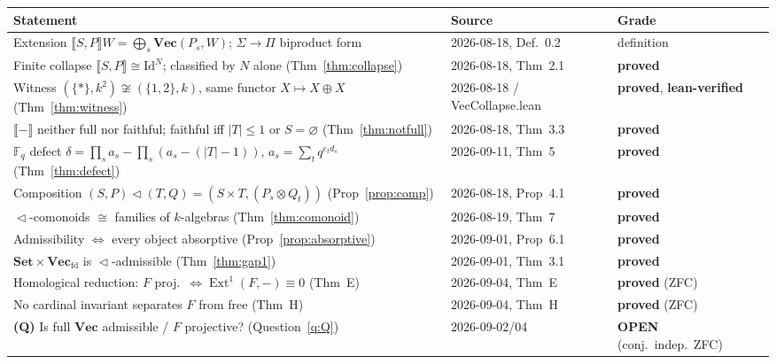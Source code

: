 \documentclass[11pt]{article}
\theoremstyle{plain}
\theoremstyle{definition}
\theoremstyle{remark}
\newcommand{\Set}{\mathbf{Set}}
\newcommand{\Vect}{\mathbf{Vec}}
\newcommand{\Vecfd}{\mathbf{Vec}_{\mathrm{fd}}}
\newcommand{\ext}[1]{\llbracket #1 \rrbracket}
\renewcommand{\lhd}{\vartriangleleft}
\DeclareMathOperator{\Ext}{Ext}
\begin{document}
\begin{center}
\small
\renewcommand{\arraystretch}{1.25}
\begin{tabular}{@{}p{} p{} p{}@{}}
\toprule
\textbf{Statement} & \textbf{Source} & \textbf{Grade}\\
\midrule
Extension $\ext{S,P}W=\bigoplus_s\Vect(P_s,W)$; $\Sigma\!\to\!\Pi$ biproduct form
  & 2026-08-18, Def.\ 0.2 & definition\\
Finite collapse $\ext{S,P}\cong\mathrm{Id}^N$; classified by $N$ alone (Thm~\ref{thm:collapse})
  & 2026-08-18, Thm~2.1 & \textbf{proved}\\
Witness $(\{\ast\},k^2)\not\cong(\{1,2\},k)$, same functor $X\mapsto X\oplus X$ (Thm~\ref{thm:witness})
  & 2026-08-18 / VecCollapse.lean & \textbf{proved}, \textbf{lean-verified}\\
$\ext{-}$ neither full nor faithful; faithful iff $|T|\leq1$ or $S=\varnothing$ (Thm~\ref{thm:notfull})
  & 2026-08-18, Thm~3.3 & \textbf{proved}\\
$\mathbb F_q$ defect $\delta=\prod_s a_s-\prod_s(a_s-(|T|-1))$, $a_s=\sum_t q^{e_t d_s}$ (Thm~\ref{thm:defect})
  & 2026-09-11, Thm~5 & \textbf{proved}\\
Composition $(S,P)\lhd(T,Q)=(S\times T,(P_s\otimes Q_t))$ (Prop~\ref{prop:comp})
  & 2026-08-18, Prop~4.1 & \textbf{proved}\\
$\lhd$-comonoids $\cong$ families of $k$-algebras (Thm~\ref{thm:comonoid})
  & 2026-08-19, Thm~7 & \textbf{proved}\\
Admissibility $\Leftrightarrow$ every object absorptive (Prop~\ref{prop:absorptive})
  & 2026-09-01, Prop~6.1 & \textbf{proved}\\
$\Set\times\Vecfd$ is $\lhd$-admissible (Thm~\ref{thm:gap1})
  & 2026-09-01, Thm~3.1 & \textbf{proved}\\
Homological reduction: $F$ proj.\ $\Leftrightarrow\Ext^1(F,-)\equiv0$ (Thm~E)
  & 2026-09-04, Thm~E & \textbf{proved} (ZFC)\\
No cardinal invariant separates $F$ from free (Thm~H)
  & 2026-09-04, Thm~H & \textbf{proved} (ZFC)\\
\textbf{(Q)} Is full $\Vect$ admissible / $F$ projective? (Question~\ref{q:Q})
  & 2026-09-02/04 & \textbf{OPEN} (conj.\ indep.\ ZFC)\\
\bottomrule
\end{tabular}
\end{center}
\end{document}
